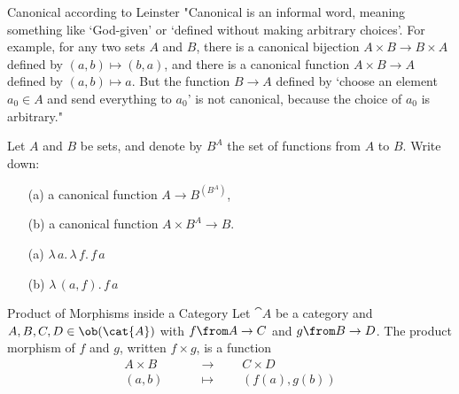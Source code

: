 \begin{definition}{Canonical according to Leinster}
  "Canonical is an informal word, meaning something like `God-given' or
  `defined without making arbitrary choices'.  For example, for any two sets
  $A$ and $B$, there is a canonical bijection $A \times B \to B \times A$
  defined by $(a, b) \mapsto (b, a)$, and there is a canonical function $A
  \times B \to A$ defined by $(a, b) \mapsto a$.  But the function $B \to A$
  defined by `choose an element $a_0 \in A$ and send everything to $a_0$' is
  not canonical, because the choice of $a_0$ is arbitrary."
\end{definition}

\begin{exercise}
  Let $A$ and $B$ be sets, and denote by $B^A$ the set of functions from $A$
  to $B$.  Write down:
  \begin{itemize}
  \item[(a)] a canonical function $A \to B^{(B^A)}$,
  \item[(b)] a canonical function $A \times B^{A} \to B$.
  \end{itemize}
\end{exercise}
\begin{answer}
    \begin{itemize}
        \item[(a)] $\lambda\, a.\, \lambda\,f.\, f\,a$
        \item[(b)] $\lambda\, (a, f).\, f\,a$
    \end{itemize}
\end{answer}

\begin{definition}{Product of Morphisms inside a Category}
  Let $\cat{A}$ be a category and $A, B, C, D \in \ob(\cat{A})$ with $f \from A \to C$ and $g \from B \to D$.
  The product morphism of $f$ and $g$, written $f \times g$, is a function
  \begin{align*}
    A \times B &\qquad\to\qquad C \times D\\
    (a, b) &\qquad\mapsto\qquad (f(a), g(b))
  \end{align*}
\end{definition}

\newcommand{\eval}[1]{\ensuremath{\mathsf{eval}^{#1}\xspace}}

